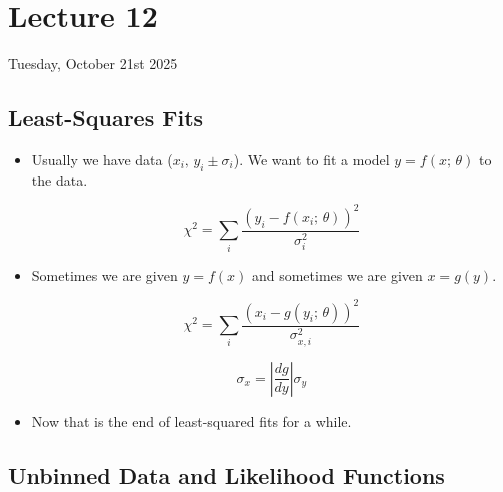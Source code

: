 \section{Lecture 12}

Tuesday, October 21st 2025

\subsection{Least-Squares Fits}

\begin{itemize}
    \item Usually we have data ($x_i, \, y_i \pm \sigma_i$). We want to fit a model $y = f(x; \, \theta)$ to the data.

          \[ \chi^2 = \sum_i \frac{(y_i - f(x_i; \, \theta))^2}{\sigma_i^2} \]

    \item Sometimes we are given $y = f(x)$ and sometimes we are given $x = g(y)$.

          \[ \chi^2 = \sum_i \frac{(x_i - g(y_i; \, \theta))^2}{\sigma_{x,i}^2} \]

          \[ \sigma_x = \left| \frac{dg}{dy} \right| \sigma_y \]

    \item Now that is the end of least-squared fits for a while.
\end{itemize}

\subsection{Unbinned Data and Likelihood Functions}

